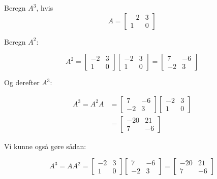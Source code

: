 \begin{example}
    Beregn $A^3$, hvis
    \[
    A=\left[\begin{array}{rr}
    -2 & 3 \\
    1 & 0
    \end{array}\right]
    \]
\end{example}

\begin{solution}

    Beregn $A^2$:

    \[
    A^2=\left[\begin{array}{rr}
    -2 & 3 \\
    1 & 0
    \end{array}\right]\left[\begin{array}{rr}
    -2 & 3 \\
    1 & 0
    \end{array}\right]=\left[\begin{array}{rr}
    7 & -6 \\
    -2 & 3
    \end{array}\right]
    \]

    Og derefter $A^3$:

    \[
    \begin{aligned}
    A^3=A^2 A & =\left[\begin{array}{rr}
    7 & -6 \\
    -2 & 3
    \end{array}\right]\left[\begin{array}{rr}
    -2 & 3 \\
    1 & 0
    \end{array}\right] \\
    & =\left[\begin{array}{rr}
    -20 & 21 \\
    7 & -6
    \end{array}\right]
    \end{aligned}
    \]

    Vi kunne også gøre sådan:

    \[
    A^3=A A^2=\left[\begin{array}{rr}
    -2 & 3 \\
    1 & 0
    \end{array}\right]\left[\begin{array}{rr}
    7 & -6 \\
    -2 & 3
    \end{array}\right]=\left[\begin{array}{rr}
    -20 & 21 \\
    7 & -6
    \end{array}\right]
    \]

\end{solution}


